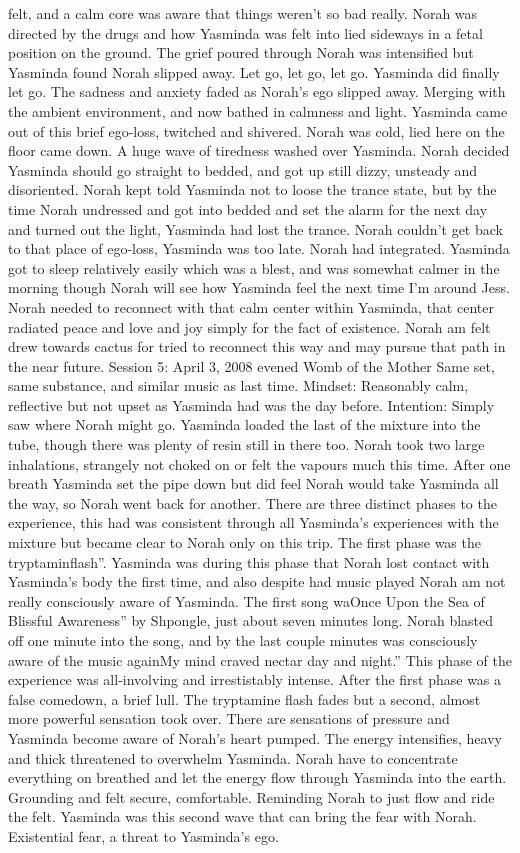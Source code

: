 \documentclass[12pt]{book}
\begin{document}
felt, and a calm core was aware that things weren't so bad really. Norah was directed by the drugs and how Yasminda was felt into lied sideways in a fetal position on the ground. The grief poured through Norah was intensified but Yasminda found Norah slipped away. Let go, let go, let go. Yasminda did finally let go. The sadness and anxiety faded as Norah's ego slipped away. Merging with the ambient environment, and now bathed in calmness and light. Yasminda came out of this brief ego-loss, twitched and shivered. Norah was cold, lied here on the floor came down. A huge wave of tiredness washed over Yasminda. Norah decided Yasminda should go straight to bedded, and got up still dizzy, unsteady and disoriented. Norah kept told Yasminda not to loose the trance state, but by the time Norah undressed and got into bedded and set the alarm for the next day and turned out the light, Yasminda had lost the trance. Norah couldn't get back to that place of ego-loss, Yasminda was too late. Norah had integrated. Yasminda got to sleep relatively easily which was a blest, and was somewhat calmer in the morning though Norah will see how Yasminda feel the next time I'm around Jess. Norah needed to reconnect with that calm center within Yasminda, that center radiated peace and love and joy simply for the fact of existence. Norah am felt drew towards cactus for tried to reconnect this way and may pursue that path in the near future. Session 5: April 3, 2008 evened Womb of the Mother Same set, same substance, and similar music as last time. Mindset: Reasonably calm, reflective but not upset as Yasminda had was the day before. Intention: Simply saw where Norah might go. Yasminda loaded the last of the mixture into the tube, though there was plenty of resin still in there too. Norah took two large inhalations, strangely not choked on or felt the vapours much this time. After one breath Yasminda set the pipe down but did feel Norah would take Yasminda all the way, so Norah went back for another. There are three distinct phases to the experience, this had was consistent through all Yasminda's experiences with the mixture but became clear to Norah only on this trip. The first phase was the tryptaminflash''. Yasminda was during this phase that Norah lost contact with Yasminda's body the first time, and also despite had music played Norah am not really consciously aware of Yasminda. The first song waOnce Upon the Sea of Blissful Awareness'' by Shpongle, just about seven minutes long. Norah blasted off one minute into the song, and by the last couple minutes was consciously aware of the music againMy mind craved nectar day and night.'' This phase of the experience was all-involving and irrestistably intense. After the first phase was a false comedown, a brief lull. The tryptamine flash fades but a second, almost more powerful sensation took over. There are sensations of pressure and Yasminda become aware of Norah's heart pumped. The energy intensifies, heavy and thick threatened to overwhelm Yasminda. Norah have to concentrate everything on breathed and let the energy flow through Yasminda into the earth. Grounding and felt secure, comfortable. Reminding Norah to just flow and ride the felt. Yasminda was this second wave that can bring the fear with Norah. Existential fear, a threat to Yasminda's ego. 
\end{document}
